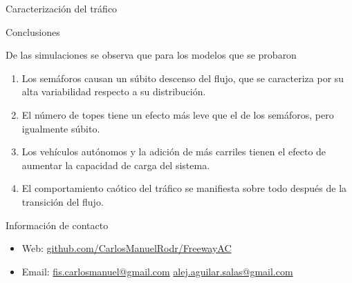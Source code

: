 \documentclass[final]{beamer}
\newlength{\onecolwid}
\begin{document}
\begin{frame}[t]
\begin{columns}[t]
\begin{column}{\onecolwid}
\begin{block}{Caracterización del tráfico}
\end{block}	


\begin{alertblock}{Conclusiones}

De las simulaciones se observa que para los modelos que se probaron
\begin{enumerate}
\item Los semáforos causan un súbito descenso del flujo, que se caracteriza por su alta variabilidad respecto a su distribución.
\item El número de topes tiene un efecto más leve que el de los semáforos, pero igualmente súbito.
\item Los vehículos autónomos y la adición de más carriles tienen el efecto de aumentar la capacidad de carga del sistema.
\item El comportamiento caótico del tráfico se manifiesta sobre todo después de la transición del flujo.
\end{enumerate}

\end{alertblock}	







\begin{alertblock}{Información de contacto}

\begin{itemize}
\item Web: \href{https://github.com/CarlosManuelRodr/FreewayAC}{github.com/CarlosManuelRodr/FreewayAC}
\item Email: \href{mailto:fis.carlosmanuel@gmail.com}{fis.carlosmanuel@gmail.com} \href{alej.aguilar.salas@gmail.com}{alej.aguilar.salas@gmail.com}
\end{itemize}


\end{alertblock}
\end{column}
\end{columns}
\end{frame}
\end{document}
